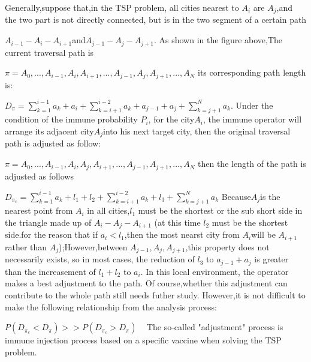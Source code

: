 \documentclass{article}
\begin{document}
Generally,suppose that,in the TSP problem, all cities nearest to $A_i$ are $A_j$,and the two part is not directly connected, but is in the two segment of a certain path
\par\setlength\parindent{7em}
$A_{i-1}-A_i-A_{i+1}$and$A_{j-1}-A_j-A_{j+1}$.
\newline
As shown in the figure above,The current traversal path is
\par\setlength\parindent{7em}
$\pi={A_0,...,A_{i-1},A_i,A_{i+1},...,A_{j-1},A_j,A_{j+1},...,A_N}$
\newline
its corresponding path length is:
\par\setlength\parindent{7em}
$D_{\pi}=\sum_{k=1}^{i-1}a_k+a_i+\sum_{k=i+1}^{i-2}a_k+a_{j-1}+a_j+\sum_{k=j+1}^{N}a_k $.
\newline
Under the condition of the immune probability $P_i$, for the city$A_i$, the immune operator will arrange its adjacent city$A_j$into his next target city, then the original traversal path is adjusted as follow:
\par\setlength\parindent{7em}
$\pi={A_0,...,A_{i-1},A_i,A_j,A_{i+1},...,A_{j-1},A_{j+1},...,A_N}$
\newline
then the length of the path is adjusted as follows
\par\setlength\parindent{7em}
$D_{\pi_c}=\sum_{k=1}^{i-1}a_k+l_1+l_2+\sum_{k=i+1}^{i-2}a_k+l_3 +\sum_{k=j+1}^{N}a_k $
\newline
Because$A_j$is the nearest point from $A_i$ in all cities,$l_1$ must be the shortest or the sub short side in the triangle made up of $A_i-A_j-A_{i+1}$ (at this time $l_2$ must be the shortest side.for the reason that if $a_i<l_1$,then the most nearst city from $A_i$will be $A_{i+1}$rather than $A_j$);However,between $A_{j-1},A_j,A_{j+1}$,this property does not necessarily exists, so in most cases, the reduction of $l_3$ to $a_{j-1}+a_j$  is greater than the increasement of $l_1+l_2$ to $a_i$.
In this local environment, the operator makes a best adjustment to the path. Of course,whether this adjustment can contribute to the whole path still needs futher study.  However,it is not difficult to make the following relationship from the analysis process:
\par\setlength\parindent{7em}
$P(D_{\pi_c}<D_{\pi})>>P(D_{\pi_c}>D_{\pi})$
\
\newline
The so-called "adjustment" process is immune injection process based on a specific vaccine when solving the TSP problem.



\end{document}

